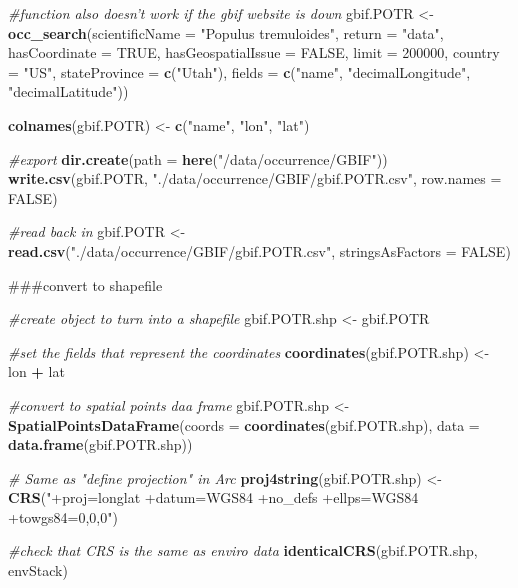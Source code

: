 \documentclass[]{article}
\newenvironment{Shaded}{\begin{snugshade}}{\end{snugshade}}
\newcommand{\KeywordTok}[1]{\textcolor[rgb]{0.13,0.29,0.53}{\textbf{#1}}}
\newcommand{\DataTypeTok}[1]{\textcolor[rgb]{0.13,0.29,0.53}{#1}}
\newcommand{\DecValTok}[1]{\textcolor[rgb]{0.00,0.00,0.81}{#1}}
\newcommand{\StringTok}[1]{\textcolor[rgb]{0.31,0.60,0.02}{#1}}
\newcommand{\CommentTok}[1]{\textcolor[rgb]{0.56,0.35,0.01}{\textit{#1}}}
\newcommand{\OtherTok}[1]{\textcolor[rgb]{0.56,0.35,0.01}{#1}}
\newcommand{\OperatorTok}[1]{\textcolor[rgb]{0.81,0.36,0.00}{\textbf{#1}}}
\newcommand{\ErrorTok}[1]{\textcolor[rgb]{0.64,0.00,0.00}{\textbf{#1}}}
\newcommand{\NormalTok}[1]{#1}
\begin{document}
\begin{Shaded}
\begin{Highlighting}[]
\CommentTok{#function also doesn't work if the gbif website is down}
\NormalTok{gbif.POTR <-}\StringTok{ }\KeywordTok{occ_search}\NormalTok{(}\DataTypeTok{scientificName =} \StringTok{"Populus tremuloides"}\NormalTok{, }
                           \DataTypeTok{return =} \StringTok{"data"}\NormalTok{, }
                           \DataTypeTok{hasCoordinate =} \OtherTok{TRUE}\NormalTok{, }
                           \DataTypeTok{hasGeospatialIssue =} \OtherTok{FALSE}\NormalTok{, }
                           \DataTypeTok{limit =} \DecValTok{200000}\NormalTok{, }
                           \DataTypeTok{country =} \StringTok{"US"}\NormalTok{, }\DataTypeTok{stateProvince =} \KeywordTok{c}\NormalTok{(}\StringTok{"Utah"}\NormalTok{), }
                           \DataTypeTok{fields =} \KeywordTok{c}\NormalTok{(}\StringTok{"name"}\NormalTok{, }\StringTok{"decimalLongitude"}\NormalTok{, }\StringTok{"decimalLatitude"}\NormalTok{))}

\KeywordTok{colnames}\NormalTok{(gbif.POTR) <-}\StringTok{ }\KeywordTok{c}\NormalTok{(}\StringTok{"name"}\NormalTok{, }\StringTok{"lon"}\NormalTok{, }\StringTok{"lat"}\NormalTok{)}

\CommentTok{#export}
\KeywordTok{dir.create}\NormalTok{(}\DataTypeTok{path =} \KeywordTok{here}\NormalTok{(}\StringTok{"/data/occurrence/GBIF"}\NormalTok{))}
\KeywordTok{write.csv}\NormalTok{(gbif.POTR, }\StringTok{"./data/occurrence/GBIF/gbif.POTR.csv"}\NormalTok{, }\DataTypeTok{row.names =} \OtherTok{FALSE}\NormalTok{)}

\CommentTok{#read back in }
\NormalTok{gbif.POTR <-}\StringTok{ }\KeywordTok{read.csv}\NormalTok{(}\StringTok{"./data/occurrence/GBIF/gbif.POTR.csv"}\NormalTok{, }\DataTypeTok{stringsAsFactors =} \OtherTok{FALSE}\NormalTok{)}

\NormalTok{###convert to shapefile }

\CommentTok{#create object to turn into a shapefile}
\NormalTok{gbif.POTR.shp <-}\StringTok{ }\NormalTok{gbif.POTR }

\CommentTok{#set the fields that represent the coordinates}
\KeywordTok{coordinates}\NormalTok{(gbif.POTR.shp) <-}\StringTok{ }\ErrorTok{~}\StringTok{ }\NormalTok{lon }\OperatorTok{+}\StringTok{ }\NormalTok{lat}

\CommentTok{#convert to spatial points daa frame}
\NormalTok{gbif.POTR.shp <-}\StringTok{ }\KeywordTok{SpatialPointsDataFrame}\NormalTok{(}\DataTypeTok{coords =} \KeywordTok{coordinates}\NormalTok{(gbif.POTR.shp), }
                                       \DataTypeTok{data =} \KeywordTok{data.frame}\NormalTok{(gbif.POTR.shp))}

\CommentTok{# Same as "define projection" in Arc}
\KeywordTok{proj4string}\NormalTok{(gbif.POTR.shp) <-}\StringTok{ }\KeywordTok{CRS}\NormalTok{(}\StringTok{"+proj=longlat +datum=WGS84 +no_defs +ellps=WGS84 +towgs84=0,0,0"}\NormalTok{) }

\CommentTok{#check that CRS is the same as enviro data}
\KeywordTok{identicalCRS}\NormalTok{(gbif.POTR.shp, envStack)}
\end{Highlighting}
\end{Shaded}
\end{document}
